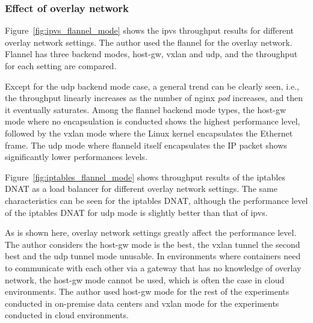 \FloatBarrier

\subsubsection{Effect of overlay network}

Figure~\ref{fig:ipvs_flannel_mode} shows the ipvs throughput results for different overlay network settings.
The author used the flannel for the overlay network.
Flannel has three backend modes, host-gw, vxlan and udp, and the throughput for each setting are compared.

Except for the udp backend mode case, a general trend can be clearly seen, i.e., the throughput linearly increases as the number of nginx {\em pod} increases, and then it eventually saturates.
Among the flannel backend mode types, the host-gw mode where no encapsulation is conducted shows the highest performance level,
followed by the vxlan mode where the Linux kernel encapsulates the Ethernet frame.
The udp mode where flanneld itself encapsulates the IP packet shows significantly lower performances levels.

Figure~\ref{fig:iptables_flannel_mode} shows throughput results of the iptables DNAT as a load balancer for different overlay network settings.
The same characteristics can be seen for the iptables DNAT, although the performance level of the iptables DNAT for udp mode is slightly better than that of ipvs.

As is shown here, overlay network settings greatly affect the performance level.
The author considers the host-gw mode is the best, the vxlan tunnel the second best and the udp tunnel mode unusable.
In environments where containers need to communicate with each other via a gateway that has no knowledge of overlay network, the host-gw mode cannot be used, which is often the case in cloud environments. 
The author used host-gw mode for the rest of the experiments conducted in on-premise data centers and vxlan mode for the experiments conducted in cloud environments.

